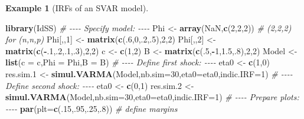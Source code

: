 \documentclass[
  12pt,
]{book}
\newenvironment{Shaded}{\begin{snugshade}}{\end{snugshade}}
\newcommand{\AttributeTok}[1]{\textcolor[rgb]{0.13,0.29,0.53}{#1}}
\newcommand{\CommentTok}[1]{\textcolor[rgb]{0.56,0.35,0.01}{\textit{#1}}}
\newcommand{\ConstantTok}[1]{\textcolor[rgb]{0.56,0.35,0.01}{#1}}
\newcommand{\DecValTok}[1]{\textcolor[rgb]{0.00,0.00,0.81}{#1}}
\newcommand{\FloatTok}[1]{\textcolor[rgb]{0.00,0.00,0.81}{#1}}
\newcommand{\FunctionTok}[1]{\textcolor[rgb]{0.13,0.29,0.53}{\textbf{#1}}}
\newcommand{\NormalTok}[1]{#1}
\newcommand{\OtherTok}[1]{\textcolor[rgb]{0.56,0.35,0.01}{#1}}
\newcommand{\SpecialCharTok}[1]{\textcolor[rgb]{0.81,0.36,0.00}{\textbf{#1}}}
\theoremstyle{definition}
\theoremstyle{definition}
\newtheorem{example}{Example}[chapter]
\theoremstyle{definition}
\theoremstyle{definition}
\theoremstyle{remark}
\begin{document}
\begin{example}[IRFs of an SVAR model]
\begin{Shaded}
\begin{Highlighting}[]
\FunctionTok{library}\NormalTok{(IdSS)}
\CommentTok{\# {-}{-}{-}{-} Specify model: {-}{-}{-}{-}}
\NormalTok{Phi }\OtherTok{\textless{}{-}} \FunctionTok{array}\NormalTok{(}\ConstantTok{NaN}\NormalTok{,}\FunctionTok{c}\NormalTok{(}\DecValTok{2}\NormalTok{,}\DecValTok{2}\NormalTok{,}\DecValTok{2}\NormalTok{)) }\CommentTok{\# (2,2,2) for (n,n,p)}
\NormalTok{Phi[,,}\DecValTok{1}\NormalTok{] }\OtherTok{\textless{}{-}} \FunctionTok{matrix}\NormalTok{(}\FunctionTok{c}\NormalTok{(.}\DecValTok{6}\NormalTok{,}\DecValTok{0}\NormalTok{,.}\DecValTok{2}\NormalTok{,.}\DecValTok{5}\NormalTok{),}\DecValTok{2}\NormalTok{,}\DecValTok{2}\NormalTok{)}
\NormalTok{Phi[,,}\DecValTok{2}\NormalTok{] }\OtherTok{\textless{}{-}} \FunctionTok{matrix}\NormalTok{(}\FunctionTok{c}\NormalTok{(}\SpecialCharTok{{-}}\NormalTok{.}\DecValTok{1}\NormalTok{,.}\DecValTok{2}\NormalTok{,.}\DecValTok{1}\NormalTok{,.}\DecValTok{3}\NormalTok{),}\DecValTok{2}\NormalTok{,}\DecValTok{2}\NormalTok{)}
\NormalTok{c }\OtherTok{\textless{}{-}} \FunctionTok{c}\NormalTok{(}\DecValTok{1}\NormalTok{,}\DecValTok{2}\NormalTok{)}
\NormalTok{B }\OtherTok{\textless{}{-}} \FunctionTok{matrix}\NormalTok{(}\FunctionTok{c}\NormalTok{(.}\DecValTok{5}\NormalTok{,}\SpecialCharTok{{-}}\DecValTok{1}\NormalTok{,}\FloatTok{1.5}\NormalTok{,.}\DecValTok{8}\NormalTok{),}\DecValTok{2}\NormalTok{,}\DecValTok{2}\NormalTok{)}
\NormalTok{Model }\OtherTok{\textless{}{-}} \FunctionTok{list}\NormalTok{(}\AttributeTok{c =}\NormalTok{ c,}\AttributeTok{Phi =}\NormalTok{ Phi,}\AttributeTok{B =}\NormalTok{ B)}
\CommentTok{\# {-}{-}{-}{-} Define first shock: {-}{-}{-}{-}}
\NormalTok{eta0 }\OtherTok{\textless{}{-}} \FunctionTok{c}\NormalTok{(}\DecValTok{1}\NormalTok{,}\DecValTok{0}\NormalTok{)}
\NormalTok{res.sim}\FloatTok{.1} \OtherTok{\textless{}{-}} \FunctionTok{simul.VARMA}\NormalTok{(Model,}\AttributeTok{nb.sim=}\DecValTok{30}\NormalTok{,}\AttributeTok{eta0=}\NormalTok{eta0,}\AttributeTok{indic.IRF=}\DecValTok{1}\NormalTok{)}
\CommentTok{\# {-}{-}{-}{-} Define second shock: {-}{-}{-}{-}}
\NormalTok{eta0 }\OtherTok{\textless{}{-}} \FunctionTok{c}\NormalTok{(}\DecValTok{0}\NormalTok{,}\DecValTok{1}\NormalTok{)}
\NormalTok{res.sim}\FloatTok{.2} \OtherTok{\textless{}{-}} \FunctionTok{simul.VARMA}\NormalTok{(Model,}\AttributeTok{nb.sim=}\DecValTok{30}\NormalTok{,}\AttributeTok{eta0=}\NormalTok{eta0,}\AttributeTok{indic.IRF=}\DecValTok{1}\NormalTok{)}
\CommentTok{\# {-}{-}{-}{-} Prepare plots: {-}{-}{-}{-}}
\FunctionTok{par}\NormalTok{(}\AttributeTok{plt=}\FunctionTok{c}\NormalTok{(.}\DecValTok{15}\NormalTok{,.}\DecValTok{95}\NormalTok{,.}\DecValTok{25}\NormalTok{,.}\DecValTok{8}\NormalTok{)) }\CommentTok{\# define margins}

\end{Highlighting}
\end{Shaded}
\end{example}
\end{document}

